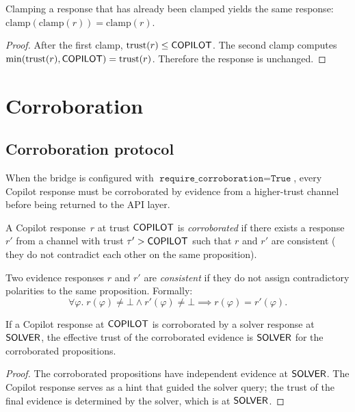 \documentclass[11pt]{article}
\begin{document}
\begin{lemma}\label{lem:clampidemp}
Clamping a response that has already been clamped yields
the same response: $\mathrm{clamp}(\mathrm{clamp}(r)) =
\mathrm{clamp}(r)$.
\end{lemma}
\begin{proof}
After the first clamp, $\mathrm{trust}(r) \leq \mathsf{COPILOT}$.
The second clamp computes $\min(\mathrm{trust}(r), \mathsf{COPILOT})
= \mathrm{trust}(r)$.  Therefore the response is unchanged.
\end{proof}

\section{Corroboration}\label{sec:corroboration}

\subsection{Corroboration protocol}

When the bridge is configured with
$\texttt{require\_corroboration} = \texttt{True}$, every
Copilot response must be corroborated by evidence from a
higher-trust channel before being returned to the API layer.

\begin{definition}[Corroboration]\label{def:corroboration}
A Copilot response~$r$ at trust $\mathsf{COPILOT}$ is
\emph{corroborated} if there exists a response~$r'$ from
a channel with trust $\tau' > \mathsf{COPILOT}$ such that
$r$ and $r'$ are consistent (\ie{} they do not contradict
each other on the same proposition).
\end{definition}

\begin{definition}[Consistency]\label{def:consistency}
Two evidence responses $r$ and $r'$ are \emph{consistent}
if they do not assign contradictory polarities to the same
proposition.  Formally:
\[
  \forall \varphi.\; r(\varphi) \neq \bot \wedge
  r'(\varphi) \neq \bot \implies
  r(\varphi) = r'(\varphi).
\]
\end{definition}

\begin{lemma}%
\label{lem:corrobtrust}
If a Copilot response at $\mathsf{COPILOT}$ is corroborated by
a solver response at $\mathsf{SOLVER}$, the effective trust of
the corroborated evidence is $\mathsf{SOLVER}$ for the
corroborated propositions.
\end{lemma}
\begin{proof}
The corroborated propositions have independent evidence at
$\mathsf{SOLVER}$.  The Copilot response serves as a hint that
guided the solver query; the trust of the final evidence
is determined by the solver, which is at $\mathsf{SOLVER}$.
\end{proof}
\end{document}
